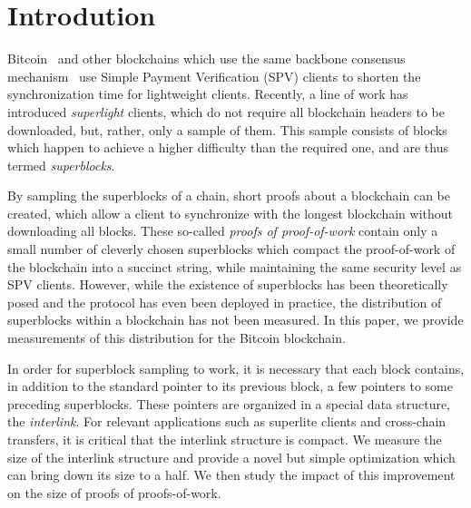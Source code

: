 \section{Introdution}

Bitcoin~\cite{bitcoin} and other blockchains which use the same backbone
consensus mechanism~\cite{EC:GarKiaLeo15} use Simple Payment Verification (SPV)
clients to shorten the synchronization time for lightweight clients. Recently, a
line of work has introduced \emph{superlight} clients, which do not require all
blockchain headers to be downloaded, but, rather, only a sample of them. This
sample consists of blocks which happen to achieve a higher difficulty than the
required one, and are thus termed \emph{superblocks}.

By sampling the superblocks of a chain, short proofs about a blockchain can be
created, which allow a client to synchronize with the longest blockchain without
downloading all blocks. These so-called \emph{proofs of proof-of-work} contain
only a small number of cleverly chosen superblocks which compact the
proof-of-work of the blockchain into a succinct string, while maintaining the
same security level as SPV clients. However, while the existence of superblocks
has been theoretically posed and the protocol has even been deployed in
practice, the distribution of superblocks within a blockchain has not been
measured. In this paper, we provide measurements of this distribution for the
Bitcoin blockchain.

In order for superblock sampling to work, it is necessary that each block
contains, in addition to the standard pointer to its previous block, a few
pointers to some preceding superblocks. These pointers are organized in a
special data structure, the \emph{interlink}. For relevant applications such as
superlite clients and cross-chain transfers, it is critical that the interlink
structure is compact. We measure the size of the interlink structure and provide
a novel but simple optimization which can bring down its size to a half. We then
study the impact of this improvement on the size of proofs of proofs-of-work.

